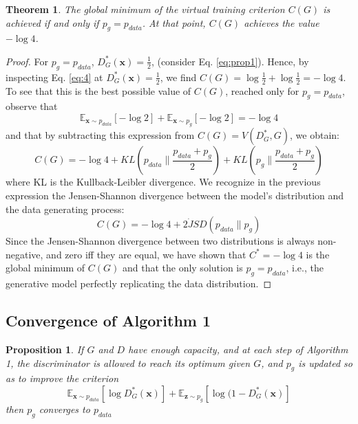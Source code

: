 \documentclass{article} %
\newtheorem{theorem}{Theorem}
\newtheorem{proposition}{Proposition}
\theoremstyle{definition}
\begin{document}
\begin{theorem}
The global minimum of the virtual training criterion $C(G)$ is achieved if and only if $p_g=p_{data}$. At that point, $C(G)$ achieves the value $-\log4$.
\end{theorem}
\begin{proof}
For $p_g=p_{data}$, $D_G^*(\textbf{x})=\frac{1}{2}$, (consider Eq. \ref{eq:prop1}). Hence, by inspecting Eq. \ref{eq:4} at $D_G^*(\textbf{x})=\frac{1}{2}$, we find $C(G) = \log \frac{1}{2} +\log \frac{1}{2} = -\log4$. To see that this is the best possible value of $C(G)$, reached only for $p_g=p_{data}$, observe that
\begin{equation}
    \mathbb{E}_{\textbf{x}\sim p_{data}}[-\log2]+\mathbb{E}_{\textbf{x}\sim p_{g}}[-\log2]=-\log4
\end{equation}
and that by subtracting this expression from $C(G) = V(D_G^*,G)$, we obtain:
\begin{equation}
    C(G) = -\log4 + KL(p_{data} \parallel \frac{p_{data}+p_{g}}{2}) + KL(p_{g} \parallel \frac{p_{data}+p_{g}}{2})
\end{equation}
where KL is the Kullback-Leibler divergence. We recognize in the previous expression the Jensen-Shannon divergence between the model's distribution and the data generating process:
\begin{equation}
    C(G) = -\log4 + 2\dot JSD(p_{data} \parallel p_{g})
\end{equation}
Since the Jensen-Shannon divergence between two distributions is always non-negative, and zero iff they are equal, we have shown that $C^*=-\log4$ is the global minimum of $C(G)$ and that the only solution is $p_g=p_{data}$, i.e., the generative model perfectly replicating the data distribution.
\end{proof}

\subsection{Convergence of Algorithm 1}
\begin{proposition}
If $G$ and $D$ have enough capacity, and at each step of Algorithm 1, the discriminator is allowed to reach its optimum given $G$, and $p_g$ is updated so as to improve the criterion
\begin{equation}
    \mathbb{E}_{\textbf{x}\sim p_{data}}[\log D_G^*(\textbf{x})] + \mathbb{E}_{\textbf{z} \sim p_g}[\log (1-D_G^*(\textbf{x})]
\end{equation}
then $p_g$ converges to $p_{data}$
\end{proposition}
\end{document}
